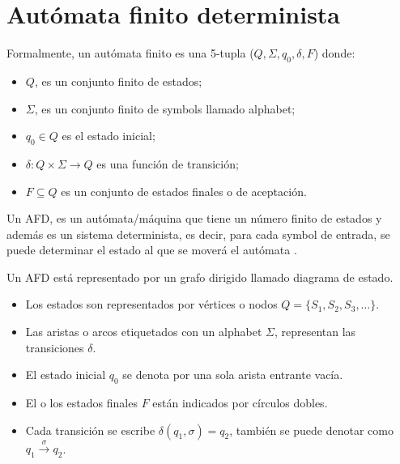 \section{Autómata finito determinista}\label{FiniteAutomaton}
Formalmente, un autómata finito es una 5-tupla ($Q, \Sigma, q_{0}, \delta, F$) donde:

\begin{itemize}
	\item $Q$, es un conjunto finito de estados;
	\item $\Sigma$, es un conjunto finito de \glspl{symbol} llamado \gls{alphabet};
	\item $q_{0}\in Q$ es el estado inicial;
	\item $\delta \colon Q\times \Sigma \to Q$ es una función de transición;
	\item $F\subseteq Q$ es un conjunto de estados finales o de aceptación.
\end{itemize}

Un \acrfull{AFD}, es un autómata/máquina que tiene un número finito de estados y además es un sistema determinista, es decir, para cada \gls{symbol} de entrada, se puede determinar el estado al que se moverá el autómata \cite{wiki:Automata_finito}. 

Un \acrshort{AFD} está representado por un grafo dirigido llamado diagrama de estado.

\begin{itemize}
	\item Los estados son representados por vértices o nodos $Q = \{ S_1, S_2, S_3, \dots \}$.
	\item Las aristas o arcos etiquetados con un \gls{alphabet} $\Sigma$, representan las transiciones $\delta$.
	\item El estado inicial $q_{0}$ se denota por una sola arista entrante vacía.
	\item El o los estados finales $F$ están indicados por círculos dobles.
	\item Cada transición se escribe  $\delta ( q_1, \sigma ) = q_2$,  también se puede denotar como $q_1 \xrightarrow{\sigma} q_2$.
\end{itemize}

